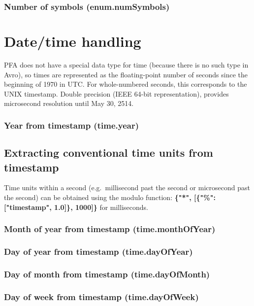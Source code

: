 \documentclass{article}
\newcommand{\PFAc}{\ttfamily\bfseries}
\theoremstyle{definition}
\begin{document}
\subsubsection{Number of symbols (enum.numSymbols)}

\pagebreak
\section{Date/time handling}

PFA does not have a special data type for time (because there is no such type in Avro), so times are represented as the floating-point number of seconds since the beginning of 1970 in UTC.  For whole-numbered seconds, this corresponds to the UNIX timestamp.  Double precision (IEEE 64-bit representation), provides microsecond resolution until May 30, 2514.

\subsubsection{Year from timestamp (time.year)}

\subsection{Extracting conventional time units from timestamp}

Time units within a second (e.g.\ millisecond past the second or microsecond past the second) can be obtained using the modulo function: {\PFAc \{"*", [\{"\%":$\!$ ["timestamp",$\!$ 1.0]\}, 1000]\}} for milliseconds.

\subsubsection{Month of year from timestamp (time.monthOfYear)}

\subsubsection{Day of year from timestamp (time.dayOfYear)}

\subsubsection{Day of month from timestamp (time.dayOfMonth)}

\subsubsection{Day of week from timestamp (time.dayOfWeek)}
\end{document}
